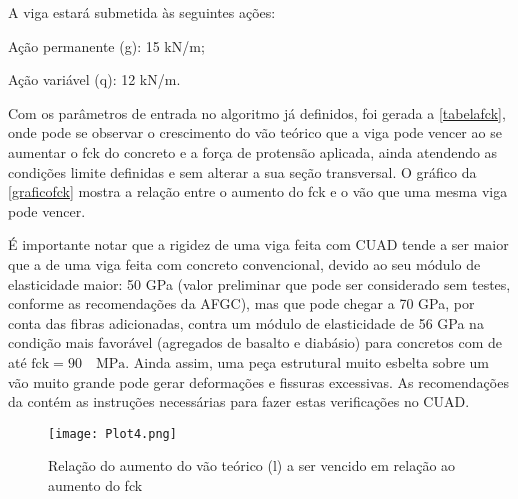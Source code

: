A viga estará submetida às seguintes ações:

\begin{alineas}
	\item Ação permanente (g): 15 kN/m;
	\item Ação variável (q): 12 kN/m.
\end{alineas}

Com os parâmetros de entrada no algoritmo já definidos, foi gerada a \autoref{tabelafck}, onde pode se observar o crescimento do vão teórico que a viga pode vencer ao se aumentar o fck do concreto e a força de protensão aplicada, ainda atendendo as condições limite definidas e sem alterar a sua seção transversal. O  gráfico da \autoref{graficofck} mostra a relação entre o aumento do fck e o vão que uma mesma viga pode vencer.

É importante notar que a rigidez de uma viga feita com CUAD tende a ser maior que a de uma viga feita com concreto convencional, devido ao seu módulo de elasticidade maior: 50 GPa (valor preliminar que pode ser considerado sem testes, conforme as recomendações da AFGC), mas que pode chegar a 70 GPa, por conta das fibras adicionadas, contra um módulo de elasticidade de 56 GPa na condição mais favorável (agregados de basalto e diabásio) para concretos com de até $ \text{fck} = 90 \quad \text{MPa}  $. Ainda assim, uma peça estrutural muito esbelta sobre um vão muito grande pode gerar deformações e fissuras excessivas. As recomendações da  contém as instruções necessárias para fazer estas verificações no CUAD.

\begin{figure}[htb]
	\caption{\label{graficofck} Relação do aumento do vão teórico (l) a ser vencido em relação ao aumento do fck}
	\begin{center}
		\texttt{[image: Plot4.png]}
	\end{center}
\end{figure}


